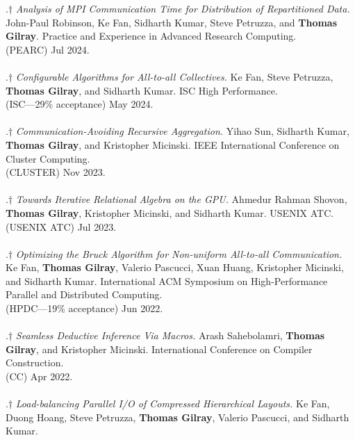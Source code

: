 \paper.$\dagger$ \textit{Analysis of MPI Communication Time for Distribution of Repartitioned Data.}
John-Paul Robinson, Ke Fan, Sidharth Kumar, Steve Petruzza, and \textbf{Thomas Gilray}.
Practice and Experience in Advanced Research Computing.
\\(PEARC) Jul 2024. 
\\ \vspace{-0.1cm}\\
\paper.$\dagger$ \textit{Configurable Algorithms for All-to-all Collectives.}
Ke Fan, Steve Petruzza, \textbf{Thomas Gilray}, and Sidharth Kumar.
ISC High Performance.
\\(ISC---29\% acceptance) May 2024. 
\\ \vspace{-0.1cm}\\
\paper.$\dagger$ \textit{Communication-Avoiding Recursive Aggregation.}
Yihao Sun, Sidharth Kumar, \textbf{Thomas Gilray}, and Kristopher Micinski.
IEEE International Conference on Cluster Computing.
\\(CLUSTER) Nov 2023. 
\\ \vspace{-0.1cm}\\
\paper.$\dagger$ \textit{Towards Iterative Relational Algebra on the GPU.}
Ahmedur Rahman Shovon, \textbf{Thomas Gilray}, Kristopher Micinski, and Sidharth Kumar.
USENIX ATC.
\\(USENIX ATC) Jul 2023. 
\\ \vspace{-0.1cm}\\
\paper.$\dagger$ \textit{Optimizing the Bruck Algorithm for Non-uniform All-to-all Communication.}
Ke Fan, \textbf{Thomas Gilray}, Valerio Pascucci, Xuan Huang, Kristopher Micinski, and Sidharth Kumar.
International ACM Symposium on High-Performance Parallel and Distributed Computing.
\\(HPDC---19\% acceptance) Jun 2022. 
\\ \vspace{-0.1cm}\\
\paper.$\dagger$ \textit{Seamless Deductive Inference Via Macros.}
Arash Sahebolamri, \textbf{Thomas Gilray}, and Kristopher Micinski.
International Conference on Compiler Construction.
\\(CC) Apr 2022. 
\\ \vspace{-0.1cm}\\
\paper.$\dagger$ \textit{Load-balancing Parallel I/O of Compressed Hierarchical Layouts.}
Ke Fan, Duong Hoang, Steve Petruzza, \textbf{Thomas Gilray}, Valerio Pascucci, and Sidharth Kumar.
